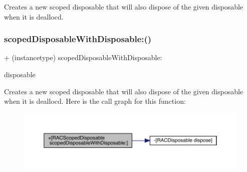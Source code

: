 Creates a new scoped disposable that will also dispose of the given disposable when it is dealloc\textquotesingle{}d. \mbox{\label{interface_r_a_c_scoped_disposable_ad516f953166b5ef543c6df3e65310ed4}} 
\subsubsection{\texorpdfstring{scoped\+Disposable\+With\+Disposable\+:()}{scopedDisposableWithDisposable:()}\hspace{0.1cm}{\footnotesize\ttfamily [2/3]}}
{\footnotesize\ttfamily + (instancetype) scoped\+Disposable\+With\+Disposable\+: \begin{DoxyParamCaption}\item[{(\mbox{\hyperlink{interface_r_a_c_disposable}{R\+A\+C\+Disposable}} $\ast$)}]{disposable }\end{DoxyParamCaption}}

Creates a new scoped disposable that will also dispose of the given disposable when it is dealloc\textquotesingle{}d. Here is the call graph for this function\+:\nopagebreak
\begin{figure}[H]
\begin{center}
\leavevmode
\includegraphics[width=350pt]{interface_r_a_c_scoped_disposable_ad516f953166b5ef543c6df3e65310ed4_cgraph}
\end{center}
\end{figure}
\mbox{\label{interface_r_a_c_scoped_disposable_ad516f953166b5ef543c6df3e65310ed4}} 
